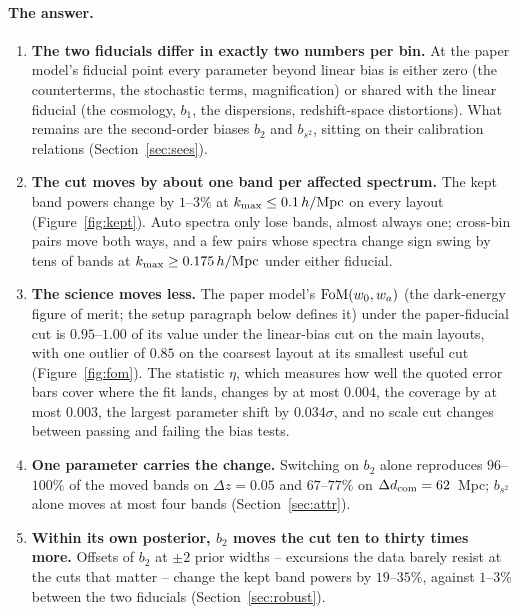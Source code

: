 \documentclass[11pt]{article}
\newcommand{\kmax}{k_{\rm max}}
\newcommand{\hMpc}{\,h/{\rm Mpc}}
\newcommand{\dcom}{$\Delta d_{\rm com} = 62$~Mpc}
\begin{document}
\paragraph{The answer.}
\begin{enumerate}
  \item \textbf{The two fiducials differ in exactly two numbers per
    bin.}  At the paper model's fiducial point every parameter beyond
    linear bias is either zero (the counterterms, the stochastic
    terms, magnification) or shared with the linear fiducial (the
    cosmology, $b_1$, the dispersions, redshift-space distortions).
    What remains are the second-order biases $b_2$ and $b_{s^2}$,
    sitting on their calibration relations
    (Section~\ref{sec:sees}).
  \item \textbf{The cut moves by about one band per affected
    spectrum.}  The kept band powers change by $1$--$3\%$ at
    $\kmax \le 0.1\hMpc$ on every layout
    (Figure~\ref{fig:kept}).  Auto spectra only lose bands, almost
    always one; cross-bin pairs move both ways, and a few pairs whose
    spectra change sign swing by tens of bands at
    $\kmax \ge 0.175\hMpc$ under either fiducial.
  \item \textbf{The science moves less.}  The paper model's
    ${\rm FoM}(w_0, w_a)$ (the dark-energy figure of merit; the setup
    paragraph below defines it) under the paper-fiducial cut is
    $0.95$--$1.00$ of its value under the linear-bias cut on the main
    layouts, with one outlier of $0.85$ on the coarsest layout at its
    smallest useful cut (Figure~\ref{fig:fom}).  The statistic
    $\eta$, which measures how well the quoted error bars cover where
    the fit lands, changes by at most $0.004$, the coverage by at
    most $0.003$, the largest parameter shift by $0.034\sigma$, and
    no scale cut changes between passing and failing the bias tests.
  \item \textbf{One parameter carries the change.}  Switching on
    $b_2$ alone reproduces $96$--$100\%$ of the moved bands on
    $\Delta z = 0.05$ and $67$--$77\%$ on \dcom{};
    $b_{s^2}$ alone moves at most four bands
    (Section~\ref{sec:attr}).
  \item \textbf{Within its own posterior, $b_2$ moves the cut ten to
    thirty times more.}  Offsets of $b_2$ at $\pm 2$ prior widths --
    excursions the data barely resist at the cuts that matter --
    change the kept band powers by $19$--$35\%$, against $1$--$3\%$
    between the two fiducials (Section~\ref{sec:robust}).
\end{enumerate}
\end{document}
